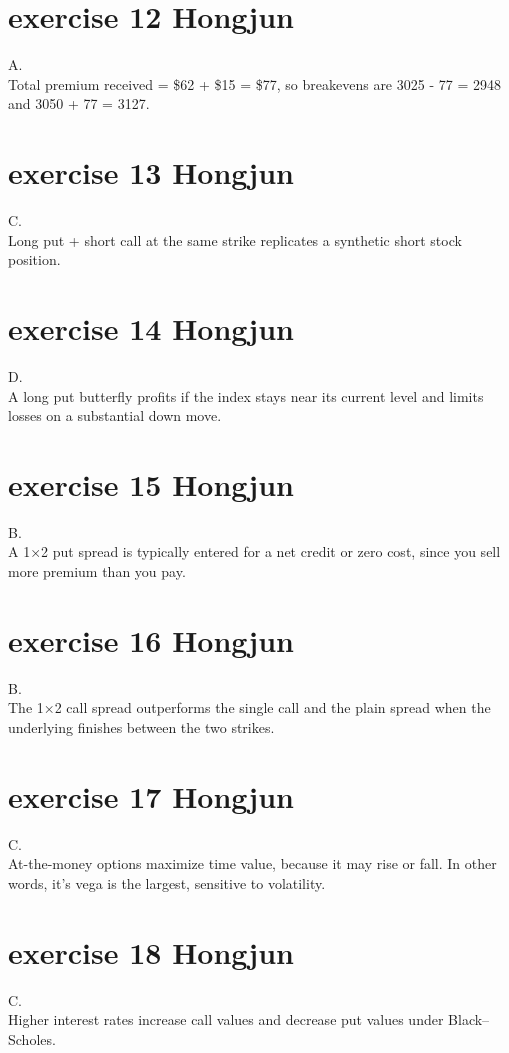 \documentclass{article}
\begin{document}
\section{exercise 12 Hongjun}
A.\\
Total premium received = \$62 + \$15 = \$77, so breakevens are 3025 - 77 = 2948 and 3050 + 77 = 3127.

\section{exercise 13 Hongjun}
C.\\
Long put + short call at the same strike replicates a synthetic short stock position.

\section{exercise 14 Hongjun}
D.\\
A long put butterfly profits if the index stays near its current level and limits losses on a substantial down move.

\section{exercise 15 Hongjun}
B.\\
A 1×2 put spread is typically entered for a net credit or zero cost, since you sell more premium than you pay.

\section{exercise 16 Hongjun}
B.\\
The 1×2 call spread outperforms the single call and the plain spread when the underlying finishes between the two strikes.

\section{exercise 17 Hongjun}
C.\\
At-the-money options maximize time value, because it may rise or fall. In other words, it’s vega is the largest, sensitive to volatility.

\section{exercise 18 Hongjun}
C.\\
Higher interest rates increase call values and decrease put values under Black–Scholes.
\end{document}
